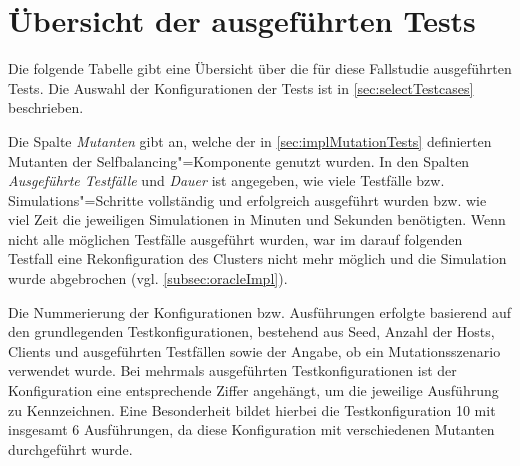 \chapter{Übersicht der ausgeführten Tests}
\label{app:overviewExecutedTestCases}

Die folgende Tabelle gibt eine Übersicht über die für diese Fallstudie ausgeführten Tests.
Die Auswahl der Konfigurationen der Tests ist in \cref{sec:selectTestcases} beschrieben.

Die Spalte \emph{Mutanten} gibt an, welche der in \cref{sec:implMutationTests} definierten Mutanten der Selfbalancing"=Komponente genutzt wurden.
In den Spalten \emph{Ausgeführte Testfälle} und \emph{Dauer} ist angegeben, wie viele Testfälle bzw. Simulations"=Schritte vollständig und erfolgreich ausgeführt wurden bzw. wie viel Zeit die jeweiligen Simulationen in Minuten und Sekunden benötigten.
Wenn nicht alle möglichen Testfälle ausgeführt wurden, war im darauf folgenden Testfall eine Rekonfiguration des Clusters nicht mehr möglich und die Simulation wurde abgebrochen (vgl. \cref{subsec:oracleImpl}).

Die Nummerierung der Konfigurationen bzw. Ausführungen erfolgte basierend auf den grundlegenden Testkonfigurationen, bestehend aus Seed, Anzahl der Hosts, Clients und ausgeführten Testfällen sowie der Angabe, ob ein Mutationsszenario verwendet wurde.
Bei mehrmals ausgeführten Testkonfigurationen ist der Konfiguration eine entsprechende Ziffer angehängt, um die jeweilige Ausführung zu Kennzeichnen.
Eine Besonderheit bildet hierbei die Testkonfiguration 10 mit insgesamt 6 Ausführungen, da diese Konfiguration mit verschiedenen Mutanten durchgeführt wurde.

